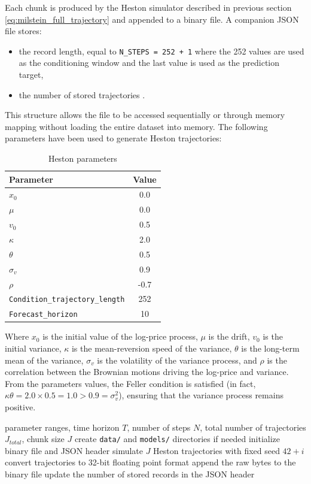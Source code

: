 Each chunk is produced by the Heston simulator described in previous section \ref{eq:milstein_full_trajectory} and appended to a binary file.
A companion JSON file stores:
\begin{itemize}
    \item the record length, equal to \texttt{N\_STEPS = 252 + 1} where the 252 values are used as the conditioning window and the last value is used as the prediction target,
    \item the number of stored trajectories .
\end{itemize}

This structure allows the file to be accessed sequentially or through memory mapping without loading the entire dataset into memory.
The following parameters have been used to generate Heston trajectories:
\begin{table}[H]
    \label{tab:heston_training_params}
\centering
\begin{tabular}{lc}
\hline
Parameter & Value \\
\hline
$x_0$      & 0.0 \\
$\mu$      & 0.0 \\
$v_0$      & 0.5 \\
$\kappa$   & 2.0 \\
$\theta$   & 0.5 \\
$\sigma_v$ & 0.9 \\
$\rho$     & -0.7 \\
\texttt{Condition\_trajectory\_length} & 252 \\
\texttt{Forecast\_horizon}     & 10 \\
\hline
\end{tabular}
\caption{Heston parameters}
\end{table}
Where $x_0$ is the initial value of the log-price process, $\mu$ is the drift, $v_0$ is the initial variance, $\kappa$ is the mean-reversion speed of the variance, $\theta$ is the long-term mean of the variance, $\sigma_v$ is the volatility of the variance process, and $\rho$ is the correlation between the Brownian motions driving the log-price and variance.
From the parameters values, the Feller condition is satisfied (in fact, $\kappa \theta = 2.0 \times 0.5 = 1.0 > 0.9 = \sigma_v^2$), ensuring that the variance process remains positive. 


\begin{algorithm}[H]
\caption{Chunked generation of the Heston dataset}
\label{alg:heston_experiment}
\begin{algorithmic}[1]
\REQUIRE parameter ranges, time horizon $T$, number of steps $N$, total number of trajectories $J_{total}$, chunk size $J$
\STATE create \texttt{data/} and \texttt{models/} directories if needed
\STATE initialize binary file and JSON header
    \STATE simulate $J$ Heston trajectories with fixed seed $42+i$
    \STATE convert trajectories to 32-bit floating point format
    \STATE append the raw bytes to the binary file
    \STATE update the number of stored records in the JSON header
\ENDFOR
\end{algorithmic}
\end{algorithm}

